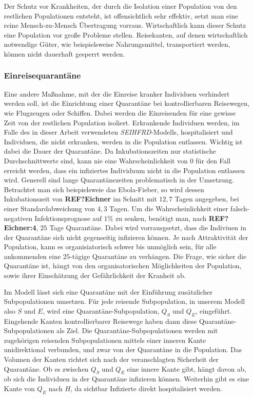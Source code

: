 Der Schutz vor Krankheiten, der durch die Isolation einer Population von den restlichen Populationen entsteht, ist offensichtlich sehr effektiv, setzt man eine reine Mensch-zu-Mensch Übertragung vorraus. Wirtschaftlich kann dieser Schutz eine Population vor große Probleme stellen. Reisekanten, auf denen wirtschaftlich notwendige Güter, wie beispielsweise Nahrungsmittel, transportiert werden, können nicht dauerhaft gesperrt werden. 

\subsubsection{Einreisequarantäne}
Eine andere Maßnahme, mit der die Einreise kranker Individuen verhindert werden soll, ist die Einrichtung einer Quarantäne bei kontrollierbaren Reisewegen, wie Flugzeugen oder Schiffen. Dabei werden die Einreisenden für eine gewisse Zeit von der restlichen Population isoliert. Erkrankende Individuen werden, im Falle des in dieser Arbeit verwendeten \emph{SEIHFRD}-Modells, hospitalisiert und Individuen, die nicht erkranken, werden in die Population entlassen. Wichtig ist dabei die Dauer der Quarantäne. Da Inkubationszeiten nur statistische Durchschnittwerte sind, kann nie eine Wahrscheinlichkeit von 0 für den Fall erreicht werden, dass ein infiziertes Individuum nicht in die Population entlassen wird. Generell sind lange Quarantänezeiten problematisch in der Umsetzung. Betrachtet man sich beispielsweie das Ebola-Fieber, so wird dessen Inkubationszeit von \textbf{REF?Eichner} im Schnitt mit $12,7$ Tagen angegeben, bei einer Standardabweichung von $4,3$ Tagen. Um die Wahrscheinlichkeit einer falsch-negativen Infektionsprognose auf $1\%$ zu senken, benötigt man, nach \textbf{REF?Eichner:4}, $25$ Tage Quarantäne. Dabei wird vorrausgsetzt, dass die Indiviuen in der Quarantäne sich nicht gegenseitig infizieren können. Je nach Attraktivität der Population, kann es organisiatorisch schwer bis unmöglich sein, für alle ankommenden eine $25$-tägige Quarantäne zu verhängen. Die Frage, wie sicher die Quarantäne ist, hängt von den organisatorischen Möglichkeiten der Population, sowie ihrer Einschätzung der Gefährlichkeit der Kranheit ab. 

Im Modell lässt sich eine Quarantäne mit der Einführung zusätzlicher Subpopulationen umsetzen. Für jede reisende Subpopulation, in unserem Modell also $S$ und $E$, wird eine Quarantäne-Subpopulation, $Q_S$ und $Q_E$, eingeführt. Eingehende Kanten kontrollierbarer Reisewege haben dann diese Quarantäne-Subpopulationen als Ziel. Die Quarantäne-Subpopulationen werden mit zugehörigen reisenden Subpopulationen mittels einer inneren Kante unidirektional verbunden, und zwar von der Quarantäne in die Population. Das Volumen der Kanten richtet sich nach der veranschlagten Sicherheit der Quarantäne. Ob es zwischen $Q_S$ und $Q_E$ eine innere Kante gibt, hängt davon ab, ob sich die Individuen in der Quarantäne infizieren können. Weiterhin gibt es eine Kante von $Q_E$ nach $H$, da sichtbar Infizierte direkt hospitalisiert werden. 

